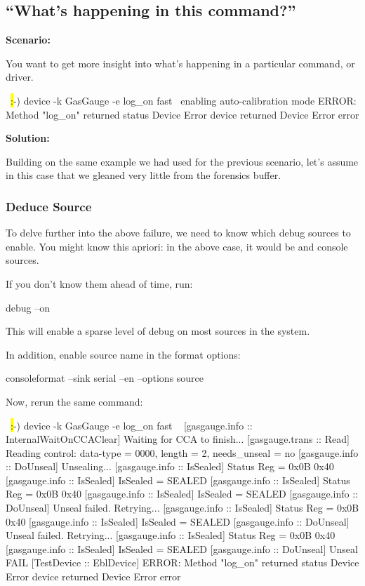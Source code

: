 \subsection{``What's happening in this command?''}

\bfseries Scenario:

\mdseries You want to get more insight into what's happening in a particular command, or driver. 

\begin{LuaCode}
~\hl:-) device -k GasGauge -e log\_on fast~
enabling auto-calibration mode
ERROR: Method "log_on" returned status Device Error
device returned Device Error error
\end{LuaCode}

\bfseries Solution:

\mdseries Building on the same example we had used for the previous scenario, let's assume in this case that we gleaned very little from the forensics buffer. 

\subsubsection{Deduce Source}

To delve further into the above failure, we need to know which debug sources to enable. You might know this 
apriori: in the above case, it would be  and  console sources. 

If you don't know them ahead of time, run:

\begin{CommandLine}
debug --on
\end{CommandLine}

This will enable a sparse level of debug on most sources in the system. 

In addition, enable source name in the format options:

\begin{CommandLine}
consoleformat --sink serial --en --options source
\end{CommandLine}

Now, rerun the same command:

\begin{LuaCode}
~\hl:-) device -k GasGauge -e log\_on fast ~
[gasgauge.info :: InternalWaitOnCCAClear] Waiting for CCA to finish...
[gasgauge.trans :: Read] Reading control: data-type = 0000, length = 2, needs_unseal = no
[gasgauge.info :: DoUnseal] Unsealing...
[gasgauge.info :: IsSealed] Status Reg = 0x0B 0x40
[gasgauge.info :: IsSealed] IsSealed = SEALED
[gasgauge.info :: IsSealed] Status Reg = 0x0B 0x40
[gasgauge.info :: IsSealed] IsSealed = SEALED
[gasgauge.info :: DoUnseal] Unseal failed. Retrying...
[gasgauge.info :: IsSealed] Status Reg = 0x0B 0x40
[gasgauge.info :: IsSealed] IsSealed = SEALED
[gasgauge.info :: DoUnseal] Unseal failed. Retrying...
[gasgauge.info :: IsSealed] Status Reg = 0x0B 0x40
[gasgauge.info :: IsSealed] IsSealed = SEALED
[gasgauge.info :: DoUnseal] Unseal FAIL
[TestDevice :: EblDevice] ERROR: Method "log_on" returned status Device Error
device returned Device Error error
\end{LuaCode}    

